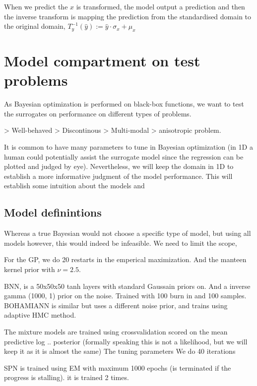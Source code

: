 When we predict the $x$ is transformed, the model output a prediction 
and then the inverse transform is mapping the prediction from the standardised
domain to the original domain, 
 $T^{-1}_y(\hat y) := \hat y \cdot \sigma_x+\mu_x$


\section{Model compartment on test problems}
As Bayesian optimization is performed on black-box functions, we want to test the surrogates on
performance on different types of problems. 

> Well-behaved
> Discontinous
> Multi-modal 
> anisotropic problem. 

It is common to have many parameters to tune in Bayesian
optimization (in 1D a human could potentially assist the surrogate model since the regression can
be plotted and judged by eye). Nevertheless, we will keep the domain in 1D to establish  
a more informative judgment of the model performance.
This will establish some intuition about the models and 

\subsection{Model definintions}
Whereas a true Bayesian would not choose a specific type of model, but using all models
however, this would indeed be infeasible. We need to limit the scope, 

For the GP, we do 20 restarts in the emperical maximization. And the manteen kernel prior
with $\nu = 2.5$. 

BNN, is a 50x50x50 tanh layers with standard Gaussain priors on. And a inverse gamma (1000, 1)
prior on the noise. Trained with 100 burn in and 100 samples. 
BOHAMIANN is similar but uses a different noise prior, and trains using adaptive HMC method. 

The mixture models are trained using crossvalidation scored on the mean predictive log .. posterior
(formally speaking this is not a likelihood, but we will keep it as it is almost the same)
The tuning parameters 
We do 40 iterations 

SPN is trained using EM with maximum 1000 epochs (is terminated if the progress is stalling). 
it is trained 2 times. 

